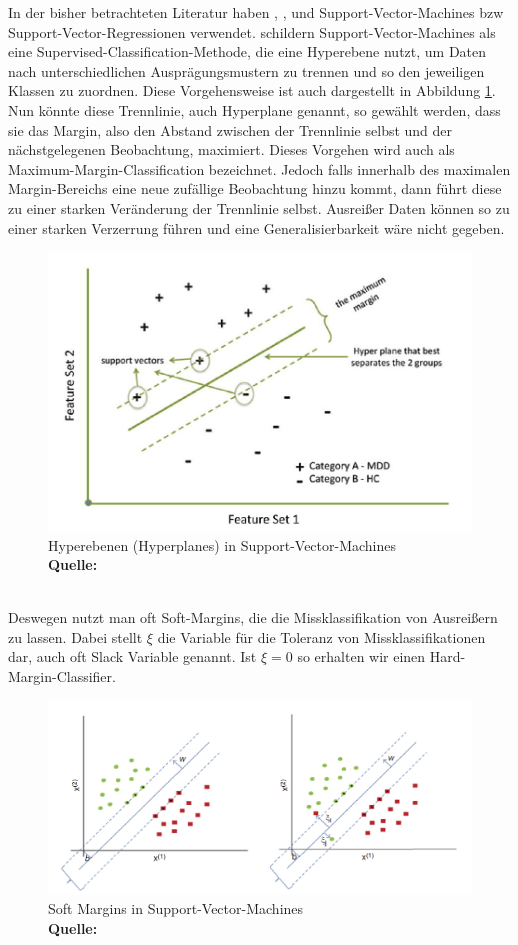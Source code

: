 \documentclass[a4paper,12pt]{thesis}
\newcommand*{\captionsource}[2]{%
	\caption[{#1}]{%
		#1%
		\\\hspace{\linewidth}%
		\textbf{Quelle:} #2%
	}%
}
\begin{document}
In der bisher betrachteten Literatur haben \cite{Holmgren2017}, \cite{Broucke2019}, \cite{Xu2013} und \cite{Gao2022} Support-Vector-Machines bzw Support-Vector-Regressionen verwendet. \cite{Pisner2020} schildern Support-Vector-Machines als eine Supervised-Classification-Methode, die eine Hyperebene nutzt, um Daten nach unterschiedlichen Ausprägungsmustern zu trennen und so den jeweiligen Klassen zu zuordnen. Diese Vorgehensweise ist auch dargestellt in Abbildung \ref{SVM}. Nun könnte diese Trennlinie, auch Hyperplane genannt, so gewählt werden, dass sie das Margin, also den Abstand zwischen der Trennlinie selbst und der nächstgelegenen Beobachtung, maximiert. Dieses Vorgehen wird auch als Maximum-Margin-Classification bezeichnet. Jedoch falls innerhalb des maximalen Margin-Bereichs eine neue zufällige Beobachtung hinzu kommt, dann führt diese zu einer starken Veränderung der Trennlinie selbst. Ausreißer Daten können so zu einer starken Verzerrung führen und eine Generalisierbarkeit wäre nicht gegeben.
\begin{figure}[!ht]
	\centering
	\includegraphics[width=\textwidth]{Plots/SVM.png}
	\captionsource{Hyperebenen (Hyperplanes) in Support-Vector-Machines}{
		\cite{Pisner2020}
	}
	\label{SVM}
\end{figure}\\
Deswegen nutzt man oft Soft-Margins, die die Missklassifikation von Ausreißern zu lassen. Dabei stellt $\xi$ die Variable für die Toleranz von Missklassifikationen dar, auch oft Slack Variable genannt. Ist $\xi=0$ so erhalten wir einen Hard-Margin-Classifier.
\begin{figure}[!ht]
	\centering
	\includegraphics[width=\textwidth]{Plots/SVM2.png}
	\captionsource{Soft Margins in Support-Vector-Machines}{
		\cite{Pisner2020}
	}
	\label{SVM2}
\end{figure}\\
\end{document}
